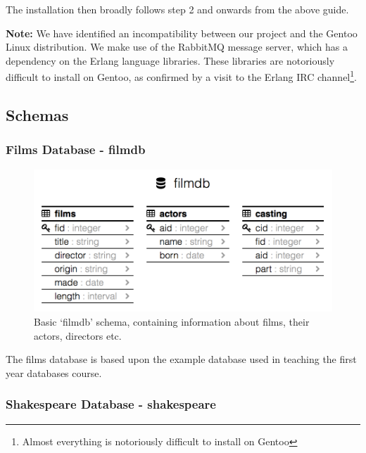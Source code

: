 \documentclass[a4paper, 11pt]{article}
\begin{document}
  The installation then broadly follows step 2 and onwards from the above
  guide. 

  \textbf{Note:} We have identified an incompatibility between our project and
  the Gentoo Linux distribution. We make use of the RabbitMQ message server,
  which has a dependency on the Erlang language libraries. These libraries
  are notoriously difficult to install on Gentoo, as confirmed by a visit to
  the Erlang IRC channel\footnote{Almost everything is notoriously difficult to
  install on Gentoo}.

  \subsection{Schemas}

    \subsubsection{Films Database - filmdb}
    \label{sec:appfilmdb}

      \begin{figure}[H]
        \includegraphics[width=\textwidth]{images/site_schema.png}
        \caption{Basic `filmdb' schema, containing information about films,
        their actors, directors etc.}
      \end{figure}

      The films database is based upon the example database used in teaching
      the first year databases course.

    \subsubsection{Shakespeare Database - shakespeare}
\end{document}
